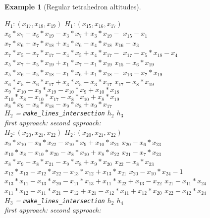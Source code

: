 \documentclass[final,1p,times,authoryear]{elsarticle}
\newtheorem{example}[theorem]{Example}
\begin{document}
\begin{example}[Regular tetrahedron altitudes]
\begin{footnotesize}
\begin{tabbing}
\>\> $H_1 : (x_{17}, x_{18}, x_{19})$  \>\> $H_1 : (x_{15}, x_{16}, x_{17})$ \\
\>\> $x_6*x_7  -  x_6*x_{19}  -  x_3*x_7  +  x_3*x_{19}  -$   \>\> $x_{15}  -  x_1$ \\
\>\>\> $x_7*x_6  +  x_7*x_{18}  +  x_4*x_6  -  x_4*x_{18}$ \> $x_{16}  -  x_3$\\
\>\> $x_7*x_5  -  x_7*x_{17}  -  x_4*x_5  +  x_4*x_{17}  -$ \>\> $x_{17}  -  x_5*x_{18}  -  x_4$ \\
\>\>\> $x_5*x_7  +  x_5*x_{19}  +  x_1*x_7  -  x_1*x_{19}$ \> $x_{15}  -  x_6*x_{19}$ \\
\>\> $x_5*x_6  -  x_5*x_{18}  -  x_1*x_6  +  x_1*x_{18}  -$ \>\> $x_{16}  -  x_7*x_{19}$ \\
\>\>\> $x_6*x_5  +  x_6*x_{17}  +  x_3*x_5  -  x_3*x_{17}$ \> $x_{17}  -  x_8*x_{19}$ \\
\>\> $x_9*x_{10}  -  x_9*x_{19}  -  x_{10}*x_9  +  x_{10}*x_{18}$ \\
\>\> $x_{10}*x_8  -  x_{10}*x_{17}  -  x_8*x_{10}  +  x_8*x_{19}$ \\
\>\> $x_8*x_9  -  x_8*x_{18}  -  x_9*x_8  +  x_9*x_{17}$ \\
\> $H_2$ = {\tt make\_lines\_intersection} $h_2$ $h_3$ \\
\>\> first approach: \>\>second approach: \\
\>\> $H_2 : (x_{20}, x_{21}, x_{22})$  \>\> $H_2 : (x_{20}, x_{21}, x_{22})$ \\
\>\> $x_9*x_{10}  -  x_9*x_{22}  -  x_{10}*x_9  +  x_{10}*x_{21}$ \>\>   $x_{20}  -  x_6*x_{23}$ \\
\>\> $x_{10}*x_8  -  x_{10}*x_{20}  -  x_8*x_{10}  +  x_8*x_{22}$ \>\>   $x_{21}  -  x_7*x_{23}$ \\
\>\> $x_8*x_9  -  x_8*x_{21}  -  x_9*x_8  +  x_9*x_{20}$ \>\>   $x_{22}  -  x_8*x_{23}$ \\
\>\> $x_{12}*x_{13}  -  x_{12}*x_{22}  -  x_{13}*x_{12}  +  x_{13}*x_{21}$ \>\>   $x_{20}  -  x_{10}*x_{24}  -1$ \\
\>\> $x_{13}*x_{11}  -  x_{13}*x_{20}  -  x_{11}*x_{13}  +  x_{11}*x_{22}  +  x_{13}  -  x_{22}$ \>\> $x_{21}  -  x_{11}*x_{24}$ \\
\>\> $x_{11}*x_{12}  -  x_{11}*x_{21}  -  x_{12}  +  x_{21}  -  x_{12}*x_{11}  +  x_{12}*x_{20}$ \>\>   $x_{22}  -  x_{12}*x_{24}$ \\
\> $H_3$ = {\tt make\_lines\_intersection} $h_2$ $h_4$ \\
\>\> first approach: \>\> second approach: \\

\end{tabbing}
\end{footnotesize}
\end{example}
\end{document}

